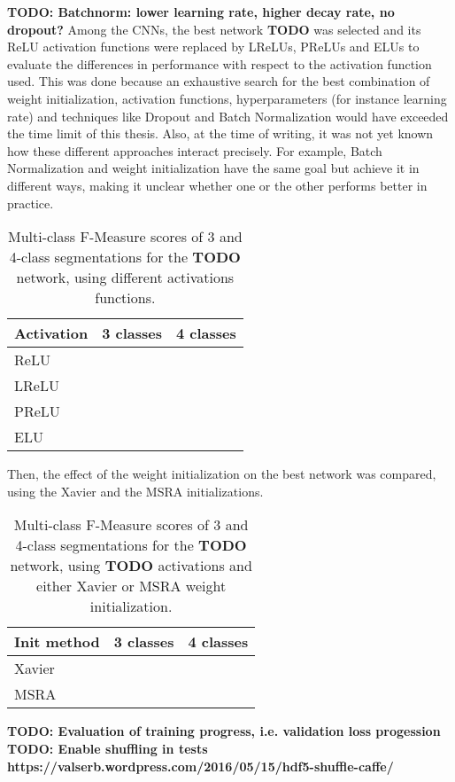 \textbf{TODO: Batchnorm: lower learning rate, higher decay rate, no dropout?}
\noindent Among the CNNs, the best network \textbf{TODO} was selected and its ReLU activation functions were replaced by LReLUs, PReLUs and ELUs to evaluate the differences in performance with respect to the activation function used. This was done because an exhaustive search for the best combination of weight initialization, activation functions, hyperparameters (for instance learning rate) and techniques like Dropout and Batch Normalization would have exceeded the time limit of this thesis. Also, at the time of writing, it was not yet known how these different approaches interact precisely. For example, Batch Normalization and weight initialization have the same goal but achieve it in different ways, making it unclear whether one or the other performs better in practice.

\begin {table}
	\centering
	\begin {tabular}[!ht]{|l|c|c|}
		\hline
		\textbf{Activation}& \textbf{3 classes}& \textbf{4 classes}\\ \hline
		ReLU& & \\ \hline
		LReLU& & \\ \hline
		PReLU& & \\ \hline
		ELU& & \\ \hline
	\end {tabular}
\caption[]{Multi-class F-Measure scores of 3 and 4-class segmentations for the \textbf{TODO} network, using different activations functions.}
\end {table}

\noindent Then, the effect of the weight initialization on the best network was compared, using the Xavier and the MSRA initializations.

\begin {table}
	\centering
	\begin {tabular}[!ht]{|l|c|c|}
		\hline
		\textbf{Init method}& \textbf{3 classes}& \textbf{4 classes}\\ \hline
		Xavier& & \\ \hline
		MSRA& & \\ \hline
	\end {tabular}
\caption[]{Multi-class F-Measure scores of 3 and 4-class segmentations for the \textbf{TODO} network, using \textbf{TODO} activations and either Xavier or MSRA weight initialization.}
\end {table}

\textbf{TODO: Evaluation of training progress, i.e. validation loss progession}\\
\textbf{TODO: Enable shuffling in tests https://valserb.wordpress.com/2016/05/15/hdf5-shuffle-caffe/}\\


